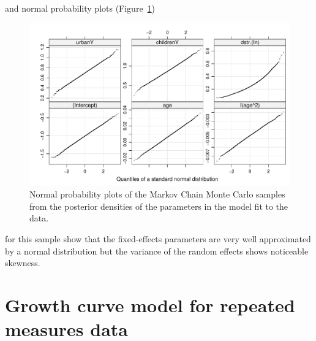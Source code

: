 \documentclass[12pt]{article}
\begin{document}
and normal probability plots (Figure~\ref{fig:Contra3})
\begin{figure}[tbp]
  \centering
  \includegraphics[width=\textwidth]{figs/SoftRev-Contra3}
  \caption{Normal probability plots of the Markov Chain Monte Carlo
    samples from the posterior densities of the parameters in the
    model  fit to the  data.} 
  \label{fig:Contra3}
\end{figure}

for this sample show that the fixed-effects
parameters are very well approximated by a normal distribution but the
variance of the random effects shows noticeable skewness.

\section{Growth curve model for repeated measures data}
\label{sec:GrowthCurve}
\end{document}
